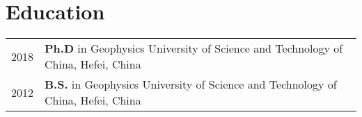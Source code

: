 \section*{Education}
\begin{tabular}{p{} p{}}
2018 & \textbf{Ph.D} in Geophysics \newline
       University of Science and Technology of China, Hefei, China \\

2012 & \textbf{B.S.} in Geophysics \newline
       University of Science and Technology of China, Hefei, China
\end{tabular}
